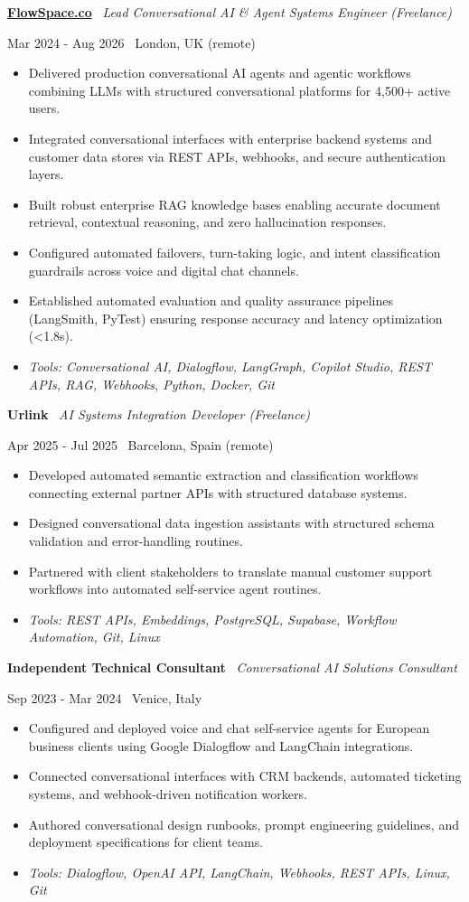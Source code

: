 \documentclass[a4paper,10pt]{article}
\newcommand{\role}[4]{%
  \vspace{2pt}\noindent
  \begin{minipage}[t]{0.70\textwidth}\raggedright\textbf{#1} \textbullet\ \textit{#3}\end{minipage}%
  \hfill
  \begin{minipage}[t]{0.28\textwidth}\raggedleft\footnotesize\color{gray}#2 \textbullet\ #4\end{minipage}%
  \vspace{1pt}%
}
\begin{document}
\role{\href{https://flowspace.co}{FlowSpace.co}}{Mar 2024 - Aug 2026}{Lead Conversational AI \& Agent Systems Engineer (Freelance)}{London, UK (remote)}
\begin{itemize}
  \item Delivered production conversational AI agents and agentic workflows combining LLMs with structured conversational platforms for 4,500+ active users.
  \item Integrated conversational interfaces with enterprise backend systems and customer data stores via REST APIs, webhooks, and secure authentication layers.
  \item Built robust enterprise RAG knowledge bases enabling accurate document retrieval, contextual reasoning, and zero hallucination responses.
  \item Configured automated failovers, turn-taking logic, and intent classification guardrails across voice and digital chat channels.
  \item Established automated evaluation and quality assurance pipelines (LangSmith, PyTest) ensuring response accuracy and latency optimization (<1.8s).
  \item \textit{Tools: Conversational AI, Dialogflow, LangGraph, Copilot Studio, REST APIs, RAG, Webhooks, Python, Docker, Git}
\end{itemize}

\role{Urlink}{Apr 2025 - Jul 2025}{AI Systems Integration Developer (Freelance)}{Barcelona, Spain (remote)}
\begin{itemize}
  \item Developed automated semantic extraction and classification workflows connecting external partner APIs with structured database systems.
  \item Designed conversational data ingestion assistants with structured schema validation and error-handling routines.
  \item Partnered with client stakeholders to translate manual customer support workflows into automated self-service agent routines.
  \item \textit{Tools: REST APIs, Embeddings, PostgreSQL, Supabase, Workflow Automation, Git, Linux}
\end{itemize}

\role{Independent Technical Consultant}{Sep 2023 - Mar 2024}{Conversational AI Solutions Consultant}{Venice, Italy}
\begin{itemize}
  \item Configured and deployed voice and chat self-service agents for European business clients using Google Dialogflow and LangChain integrations.
  \item Connected conversational interfaces with CRM backends, automated ticketing systems, and webhook-driven notification workers.
  \item Authored conversational design runbooks, prompt engineering guidelines, and deployment specifications for client teams.
  \item \textit{Tools: Dialogflow, OpenAI API, LangChain, Webhooks, REST APIs, Linux, Git}
\end{itemize}
\end{document}
